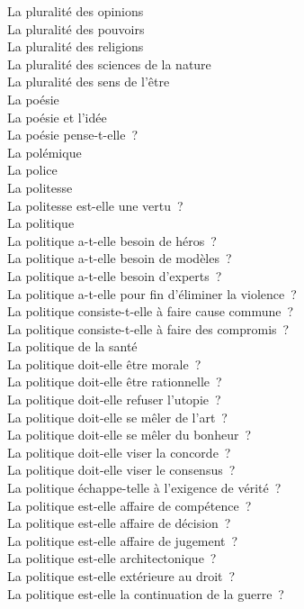 \documentclass[a4paper,12pt]{article}
\begin{document}
La pluralité des opinions \\
La pluralité des pouvoirs \\
La pluralité des religions \\
La pluralité des sciences de la nature \\
La pluralité des sens de l'être \\
La poésie \\
La poésie et l'idée \\
La poésie pense-t-elle ? \\
La polémique \\
La police \\
La politesse \\
La politesse est-elle une vertu ? \\
La politique \\
La politique a-t-elle besoin de héros ? \\
La politique a-t-elle besoin de modèles ? \\
La politique a-t-elle besoin d'experts ? \\
La politique a-t-elle pour fin d'éliminer la violence ? \\
La politique consiste-t-elle à faire cause commune ? \\
La politique consiste-t-elle à faire des compromis ? \\
La politique de la santé \\
La politique doit-elle être morale ? \\
La politique doit-elle être rationnelle ? \\
La politique doit-elle refuser l'utopie ? \\
La politique doit-elle se mêler de l'art ? \\
La politique doit-elle se mêler du bonheur ? \\
La politique doit-elle viser la concorde ? \\
La politique doit-elle viser le consensus ? \\
La politique échappe-telle à l'exigence de vérité ? \\
La politique est-elle affaire de compétence ? \\
La politique est-elle affaire de décision ? \\
La politique est-elle affaire de jugement ? \\
La politique est-elle architectonique ? \\
La politique est-elle extérieure au droit ? \\
La politique est-elle la continuation de la guerre ? \\
\end{document}
